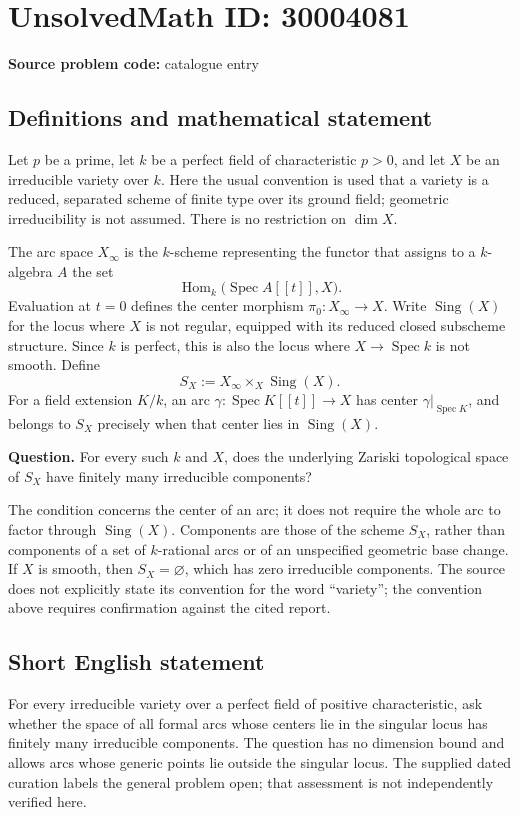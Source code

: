 \documentclass[11pt]{article}
\begin{document}
\section*{UnsolvedMath ID: 30004081}
\textbf{Source problem code:} catalogue entry
\subsection{Definitions and mathematical statement}
Let \(p\) be a prime, let \(k\) be a perfect field of characteristic \(p>0\), and let \(X\) be an irreducible variety over \(k\). Here the usual convention is used that a variety is a reduced, separated scheme of finite type over its ground field; geometric irreducibility is not assumed. There is no restriction on \(\dim X\).

The arc space \(X_\infty\) is the \(k\)-scheme representing the functor that assigns to a \(k\)-algebra \(A\) the set
\[
\operatorname{Hom}_k\bigl(\operatorname{Spec} A[[t]],X\bigr).
\]
Evaluation at \(t=0\) defines the center morphism \(\pi_0:X_\infty\to X\). Write \(\operatorname{Sing}(X)\) for the locus where \(X\) is not regular, equipped with its reduced closed subscheme structure. Since \(k\) is perfect, this is also the locus where \(X\to\operatorname{Spec}k\) is not smooth. Define
\[
S_X:=X_\infty\times_X\operatorname{Sing}(X).
\]
For a field extension \(K/k\), an arc \(\gamma:\operatorname{Spec}K[[t]]\to X\) has center \(\gamma|_{\operatorname{Spec}K}\), and belongs to \(S_X\) precisely when that center lies in \(\operatorname{Sing}(X)\).

\textbf{Question.} For every such \(k\) and \(X\), does the underlying Zariski topological space of \(S_X\) have finitely many irreducible components?

The condition concerns the center of an arc; it does not require the whole arc to factor through \(\operatorname{Sing}(X)\). Components are those of the scheme \(S_X\), rather than components of a set of \(k\)-rational arcs or of an unspecified geometric base change. If \(X\) is smooth, then \(S_X=\varnothing\), which has zero irreducible components. The source does not explicitly state its convention for the word ``variety''; the convention above requires confirmation against the cited report.
\subsection{Short English statement}
For every irreducible variety over a perfect field of positive characteristic, ask whether the space of all formal arcs whose centers lie in the singular locus has finitely many irreducible components. The question has no dimension bound and allows arcs whose generic points lie outside the singular locus. The supplied dated curation labels the general problem open; that assessment is not independently verified here.
\end{document}
